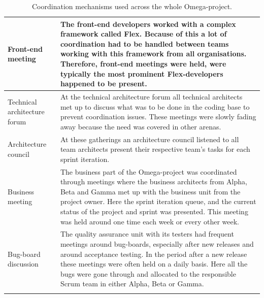 \begin{center}
\begin{longtable}{| p{6cm} | p{9cm} |}
    Front-end meeting & The front-end developers worked with a complex framework called Flex. Because of this a lot of coordination had to be handled between teams working with this framework from all organisations. Therefore, front-end meetings were held, were typically the most prominent Flex-developers happened to be present. \\ \hline
    Technical architecture forum & At the technical architecture forum all technical architects met up to discuss what was to be done in the coding base to prevent coordination issues. These meetings were slowly fading away because the need was covered in other arenas. \\ \hline
    Architecture council & At these gatherings an architecture council listened to all team architects present their respective team's tasks for each sprint iteration. \\ \hline
    Business meeting & The business part of the Omega-project was coordinated through meetings where the business architects from Alpha, Beta and Gamma met up with the business unit from the project owner. Here the sprint iteration queue, and the current status of the project and sprint was presented. This meeting was held around one time each week or every other week. \\ \hline
    Bug-board discussion & The quality assurance unit with its testers had frequent meetings around bug-boards, especially after new releases and around acceptance testing. In the period after a new release these meetings were often held on a daily basis. Here all the bugs were gone through and allocated to the responsible Scrum team in either Alpha, Beta or Gamma. \\ \hline
    
    \caption{Coordination mechanisms used across the whole Omega-project.}
    \label{cmuatwo} 
    \end{longtable}
\end{center}

